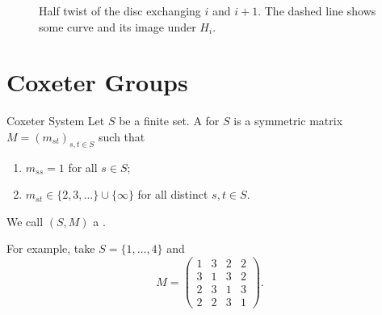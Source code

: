 \documentclass[fleqn]{NotesClass}
\begin{document}
    \begin{figure}
        \centering
        \caption[Half twist of the disc]{Half twist of the disc exchanging \(i\) and \(i + 1\). The dashed line shows some curve and its image under \(H_i\).}
        \label{fig:half twist of the disc}
    \end{figure}
    
    \section{Coxeter Groups}
    \begin{dfn}{Coxeter System}{}
        Let \(S\) be a finite set.
        A  for \(S\) is a symmetric matrix \(M = (m_{st})_{s,t \in S}\) such that
        \begin{enumerate}
            \item \(m_{ss} = 1\) for all \(s \in S\);
            \item \(m_{st} \in \{2, 3, \dotsc\} \cup \{\infty\}\) for all distinct \(s, t \in S\).
        \end{enumerate}
        We call \((S, M)\) a .
    \end{dfn}
    
    For example, take \(S = \{1, \dotsc, 4\}\) and
    \begin{equation}
        \label{eqn:S5 coxeter matrix}
        M = 
        \begin{pmatrix}
            1 & 3 & 2 & 2\\
            3 & 1 & 3 & 2\\
            2 & 3 & 1 & 3\\
            2 & 2 & 3 & 1
        \end{pmatrix}
        .
    \end{equation}
    
\end{document}
